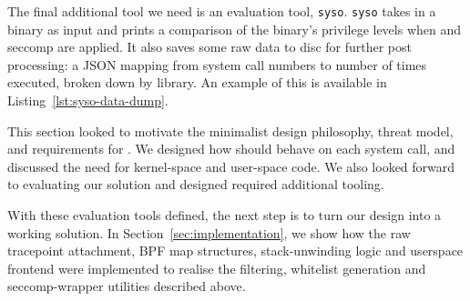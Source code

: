 The final additional tool we need is an evaluation tool, \texttt{syso}.
\texttt{syso} takes in a binary as input and prints a comparison of the 
binary's privilege levels  when \af and seccomp are applied. It also saves
some raw data to disc for further post processing: a JSON mapping from
system call numbers to number of times executed, broken down by library. An
example of this is available in Listing~\ref{lst:syso-data-dump}.

This section looked to motivate the minimalist design philosophy, threat model,
and requirements for \af. We designed how \af should behave on each system call,
and discussed the need for kernel-space and user-space code. We also looked
forward to evaluating our solution and designed required additional tooling.

With these evaluation tools defined, the next step is to turn our design into a
working solution. In Section \ref{sec:implementation}, we show how the raw 
tracepoint attachment, BPF map structures, stack-unwinding logic and userspace 
frontend were implemented to realise the filtering, whitelist generation and 
seccomp-wrapper utilities described above.
